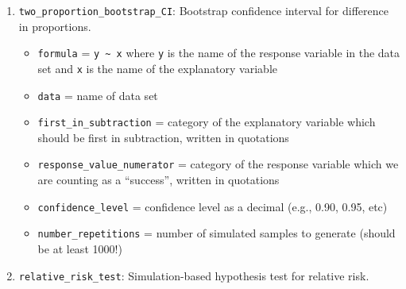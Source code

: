 \documentclass[
  10pt,
  openany]{book}
\providecommand{\tightlist}{%
  \setlength{\itemsep}{0pt}\setlength{\parskip}{0pt}}
\theoremstyle{definition}
\theoremstyle{definition}
\theoremstyle{definition}
\theoremstyle{definition}
\theoremstyle{remark}
\begin{document}
\begin{enumerate}
  \begin{itemize}
  \tightlist
  \item
    \texttt{formula} = \texttt{y\ \textasciitilde{}\ x} where \texttt{y} is the name of the response variable in the data set and \texttt{x} is the name of the explanatory variable
  \item
    \texttt{data} = name of data set
  \item
    \texttt{first\_in\_subtraction} = category of the explanatory variable which should be first in subtraction, written in quotations
  \item
    \texttt{response\_value\_numerator} = category of the response variable which we are counting as a ``success'', written in quotations
  \item
    \texttt{direction} = one of \texttt{"greater"}, \texttt{"less"}, or \texttt{"two-sided"} (quotations are important here!) to match the sign in \(H_A\)
  \item
    \texttt{as\_extreme\_as} = value of observed difference in proportions
  \item
    \texttt{number\_repetitions} = number of simulated samples to generate (should be at least 1000!)
  \end{itemize}
\item
  \texttt{two\_proportion\_bootstrap\_CI}: Bootstrap confidence interval for difference in proportions.

  \begin{itemize}
  \tightlist
  \item
    \texttt{formula} = \texttt{y\ \textasciitilde{}\ x} where \texttt{y} is the name of the response variable in the data set and \texttt{x} is the name of the explanatory variable
  \item
    \texttt{data} = name of data set
  \item
    \texttt{first\_in\_subtraction} = category of the explanatory variable which should be first in subtraction, written in quotations
  \item
    \texttt{response\_value\_numerator} = category of the response variable which we are counting as a ``success'', written in quotations
  \item
    \texttt{confidence\_level} = confidence level as a decimal (e.g., 0.90, 0.95, etc)
  \item
    \texttt{number\_repetitions} = number of simulated samples to generate (should be at least 1000!)
  \end{itemize}
\item
  \texttt{relative\_risk\_test}: Simulation-based hypothesis test for relative risk.


\end{enumerate}
\end{document}
